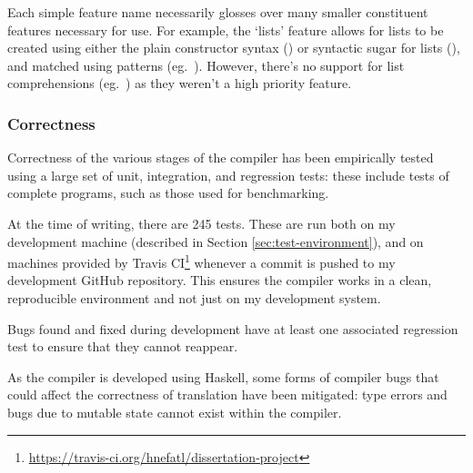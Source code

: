 \documentclass[dissertation.tex]{subfiles}
\begin{document}
{    Each simple feature name necessarily glosses over many smaller constituent features necessary for use. For example, the `lists' feature allows for lists to be created using either the plain constructor syntax () or syntactic sugar for lists (\haskell{[1,2,3]}), and matched using patterns (eg.\ \haskell{[x,y] = [1,2]}). However, there's no support for list comprehensions (eg.\ \haskell{[f x | x <- [1,2,3], even x]}) as they weren't a high priority feature.
    
    \subsubsection{Correctness}
    {
        Correctness of the various stages of the compiler has been empirically tested using a large set of unit, integration, and regression tests: these include tests of complete programs, such as those used for benchmarking.
        
        At the time of writing, there are 245 tests. These are run both on my development machine (described in Section \ref{sec:test-environment}), and on machines provided by Travis CI\footnote{\url{https://travis-ci.org/hnefatl/dissertation-project}} whenever a commit is pushed to my development GitHub repository. This ensures the compiler works in a clean, reproducible environment and not just on my development system.

        Bugs found and fixed during development have at least one associated regression test to ensure that they cannot reappear.

        As the compiler is developed using Haskell, some forms of compiler bugs that could affect the correctness of translation have been mitigated: type errors and bugs due to mutable state cannot exist within the compiler.
    }
}
\end{document}
